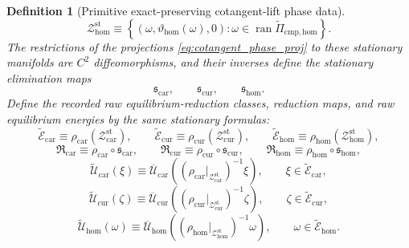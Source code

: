 \documentclass[11pt]{article}
\newcommand{\HomEqCmpProj}{\widetilde\Pi_{\mathrm{cmp,hom}}}
\newcommand{\TensorRawEqClass}{\widetilde{\mathscr E}_{\mathrm{car}}}
\newcommand{\CurRawEqClass}{\widetilde{\mathscr E}_{\mathrm{cur}}}
\newcommand{\HomRawEqClass}{\widetilde{\mathscr E}_{\mathrm{hom}}}
\newcommand{\TensorEqReduce}{\mathfrak R_{\mathrm{car}}}
\newcommand{\CurEqReduce}{\mathfrak R_{\mathrm{cur}}}
\newcommand{\HomEqReduce}{\mathfrak R_{\mathrm{hom}}}
\newcommand{\TensorRawEnergy}{\widetilde{\mathcal U}_{\mathrm{car}}}
\newcommand{\CurRawEnergy}{\widetilde{\mathcal U}_{\mathrm{cur}}}
\newcommand{\HomRawEnergy}{\widetilde{\mathcal U}_{\mathrm{hom}}}
\newcommand{\TensorPhaseRead}{\rho_{\mathrm{car}}}
\newcommand{\CurPhaseRead}{\rho_{\mathrm{cur}}}
\newcommand{\HomPhaseRead}{\rho_{\mathrm{hom}}}
\newcommand{\TensorPhaseEnergy}{\overline{\mathcal U}_{\mathrm{car}}}
\newcommand{\CurPhaseEnergy}{\overline{\mathcal U}_{\mathrm{cur}}}
\newcommand{\HomPhaseEnergy}{\overline{\mathcal U}_{\mathrm{hom}}}
\newcommand{\TensorStationaryManifold}{\mathcal Z_{\mathrm{car}}^{\mathrm{st}}}
\newcommand{\CurStationaryManifold}{\mathcal Z_{\mathrm{cur}}^{\mathrm{st}}}
\newcommand{\HomStationaryManifold}{\mathcal Z_{\mathrm{hom}}^{\mathrm{st}}}
\newcommand{\TensorStationarySolve}{\mathfrak s_{\mathrm{car}}}
\newcommand{\CurStationarySolve}{\mathfrak s_{\mathrm{cur}}}
\newcommand{\HomStationarySolve}{\mathfrak s_{\mathrm{hom}}}
\newtheorem{definition}{Definition}
\begin{document}
\begin{definition}[Primitive exact-preserving cotangent-lift phase data]
\begin{equation}
\label{eq:cotangent_stationary_cur}
\end{equation}
\begin{equation}
\HomStationaryManifold
\equiv
\left\{
(\omega,\vartheta_{\mathrm{hom}}(\omega),0):
\omega\in\operatorname{ran}\HomEqCmpProj
\right\}.
\label{eq:cotangent_stationary_hom}
\end{equation}
The restrictions of the projections \eqref{eq:cotangent_phase_proj} to these stationary manifolds are \(C^2\) diffeomorphisms, and their inverses define the stationary elimination maps
\[
\TensorStationarySolve,\qquad
\CurStationarySolve,\qquad
\HomStationarySolve.
\]
Define the recorded raw equilibrium-reduction classes, reduction maps, and raw equilibrium energies by the same stationary formulas:
\begin{equation}
\TensorRawEqClass\equiv\TensorPhaseRead(\TensorStationaryManifold),\qquad
\CurRawEqClass\equiv\CurPhaseRead(\CurStationaryManifold),\qquad
\HomRawEqClass\equiv\HomPhaseRead(\HomStationaryManifold),
\label{eq:cotangent_raw_eq_class}
\end{equation}
\begin{equation}
\TensorEqReduce\equiv\TensorPhaseRead\circ\TensorStationarySolve,\qquad
\CurEqReduce\equiv\CurPhaseRead\circ\CurStationarySolve,\qquad
\HomEqReduce\equiv\HomPhaseRead\circ\HomStationarySolve,
\label{eq:cotangent_reduction}
\end{equation}
\begin{equation}
\TensorRawEnergy(\xi)
\equiv
\TensorPhaseEnergy\!\left(
\left(\TensorPhaseRead\big|_{\TensorStationaryManifold}\right)^{-1}\xi
\right),
\qquad
\xi\in\TensorRawEqClass,
\label{eq:cotangent_raw_energy_car}
\end{equation}
\begin{equation}
\CurRawEnergy(\zeta)
\equiv
\CurPhaseEnergy\!\left(
\left(\CurPhaseRead\big|_{\CurStationaryManifold}\right)^{-1}\zeta
\right),
\qquad
\zeta\in\CurRawEqClass,
\label{eq:cotangent_raw_energy_cur}
\end{equation}
\begin{equation}
\HomRawEnergy(\omega)
\equiv
\HomPhaseEnergy\!\left(
\left(\HomPhaseRead\big|_{\HomStationaryManifold}\right)^{-1}\omega
\right),
\qquad
\omega\in\HomRawEqClass.
\label{eq:cotangent_raw_energy_hom}
\end{equation}


\end{definition}
\end{document}
